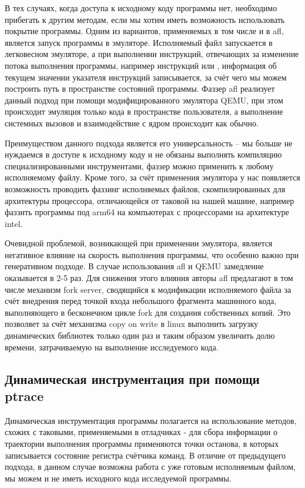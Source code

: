 В тех случаях, когда доступа к исходному коду программы нет, необходимо прибегать к другим методам, если мы хотим иметь возможность использовать покрытие программы. Одним из вариантов, применяемых в том числе и в afl, является запуск программы в эмуляторе. Исполняемый файл запускается в легковесном эмуляторе, а при выполнении инструкций, отвечающих за изменение потока выполнения программы, например инструкций  или , информация об текущем значении указателя инструкций записывается, за счёт чего мы можем построить путь в пространстве состояний программы. Фаззер afl реализует данный подход при помощи модифицированного эмулятора QEMU, при этом происходит эмуляция только кода в пространстве пользователя, а выполнение системных вызовов и взаимодействие с ядром происходит как обычно.

Преимуществом данного подхода является его универсальность -- мы больше не нуждаемся в доступе к исходному коду и не обязаны выполнять компиляцию специализированными инструментами, фаззер можно применить к любому исполняемому файлу. Кроме того, за счёт применения эмулятора у нас появляется возможность проводить фаззинг исполняемых файлов, скомпилированных для архитектуры процессора, отличающейся от таковой на нашей машине, например фаззить программы под arm64 на компьютерах с процессорами на архитектуре intel.

Очевидной проблемой, возникающей при применении эмулятора, является негативное влияние на скорость выполнения программы, что особенно важно при генеративном подходе. В случае использования afl и QEMU замедление оказывается в 2-5 раз. Для снижения этого влияния авторы afl предлагают в том числе механизм fork server, сводящийся к модификации исполняемого файла за счёт внедрения перед точкой входа небольшого фрагмента машинного кода, выполняющего в бесконечном цикле fork для создания собственных копий. Это позволяет за счёт механизма copy on write в linux выполнить загрузку динамических библиотек только один раз и таким образом увеличить долю времени, затрачиваемую на выполнение исследуемого кода.

\subsection{Динамическая инструментация при помощи ptrace}

Динамическая инструментация программы полагается на использование методов, схожих с таковыми, применяемыми в отладчиках - для сбора информации о траектории выполнения программы применяются точки останова, в которых записывается состояние регистра счётчика команд. В отличие от предыдущего подхода, в данном случае возможна работа с уже готовым исполняемым файлом, мы можем и не иметь исходного кода исследуемой программы.

